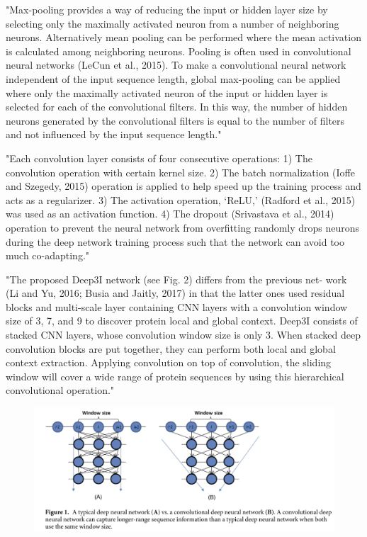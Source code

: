 \documentclass[]{scrartcl}
\begin{document}
"Max-pooling provides a way of reducing the input or hidden layer size by selecting only the maximally activated neuron from a number of neighboring neurons. Alternatively mean pooling can be performed where the mean activation is calculated among neighboring neurons. Pooling is often used in convolutional neural networks (LeCun et al., 2015). To make a convolutional neural network independent of the input sequence length, global max-pooling can be applied where only the maximally activated neuron of the input or hidden layer is selected for each of the convolutional filters. In this way, the number of hidden neurons generated by the convolutional filters is equal to the number of filters and not influenced by the input sequence length." \cite{Jurtz2017}

"Each convolution layer consists of four consecutive operations: 1) The convolution operation with certain kernel size. 2) The batch normalization (Ioffe and Szegedy, 2015) operation is applied to help speed up
the training process and acts as a regularizer. 3) The activation operation, ‘ReLU,’ (Radford et al., 2015) was used as an activation function. 4) The dropout (Srivastava et al., 2014) operation to prevent the neural network from overfitting randomly drops neurons during the deep network training process such that the network can avoid too much co-adapting." \cite{Fang2017}

"The proposed Deep3I network (see Fig. 2) differs from the previous net- work (Li and Yu, 2016; Busia and Jaitly, 2017) in that the latter ones used residual blocks and multi-scale layer containing CNN layers with a convolution window size of 3, 7, and 9 to discover protein local and global context. Deep3I consists of stacked CNN layers, whose convolution window size is only 3. When stacked deep convolution blocks are put together, they can perform both local and global context extraction. Applying convolution on top of convolution, the sliding window will cover a wide range of protein sequences by using this hierarchical convolutional operation." \cite{Fang2017}
\begin{figure}[h]
	\centering
	\includegraphics[width=1\linewidth]{cnnwang}
\end{figure}
\end{document}
